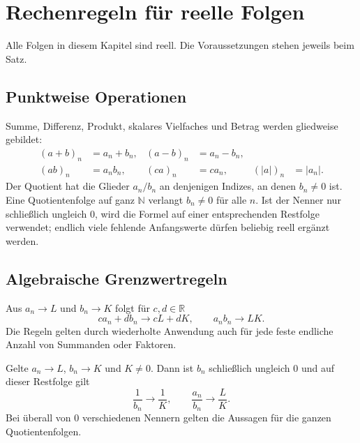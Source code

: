 \chapter{Rechenregeln für reelle Folgen}
\label{b21guide:ch:calculus}

Alle Folgen in diesem Kapitel sind reell. Die Voraussetzungen
stehen jeweils beim Satz.

\section{Punktweise Operationen}

\begin{definition}
Summe, Differenz, Produkt, skalares Vielfaches und Betrag werden
gliedweise gebildet:
\[
 \begin{aligned}
 (a+b)_n&=a_n+b_n,& (a-b)_n&=a_n-b_n,\\
 (ab)_n&=a_nb_n,& (ca)_n&=ca_n,& (|a|)_n&=|a_n|.
 \end{aligned}
\]
Der Quotient hat die Glieder $a_n/b_n$ an denjenigen Indizes,
an denen $b_n\ne0$ ist. Eine Quotientenfolge auf ganz $\mathbb N$
verlangt $b_n\ne0$ für alle $n$.
Ist der Nenner nur schließlich ungleich $0$, wird die Formel
auf einer entsprechenden Restfolge verwendet; endlich viele
fehlende Anfangswerte dürfen beliebig reell ergänzt werden.
\end{definition}

\section{Algebraische Grenzwertregeln}

\begin{theorem}
\label{b21guide:thm:algebra}
Aus $a_n\to L$ und $b_n\to K$ folgt für $c,d\in\mathbb R$
\[
 ca_n+db_n\to cL+dK,\qquad a_nb_n\to LK.
\]
Die Regeln gelten durch wiederholte Anwendung auch für jede
feste endliche Anzahl von Summanden oder Faktoren.
\end{theorem}

\begin{theorem}
\label{b21guide:thm:quotient}
Gelte $a_n\to L$, $b_n\to K$ und $K\ne0$.
Dann ist $b_n$ schließlich ungleich $0$ und auf dieser Restfolge gilt
\[
 \frac1{b_n}\to\frac1K,\qquad
 \frac{a_n}{b_n}\to\frac LK.
\]
Bei überall von $0$ verschiedenen Nennern gelten die Aussagen
für die ganzen Quotientenfolgen.
\end{theorem}

